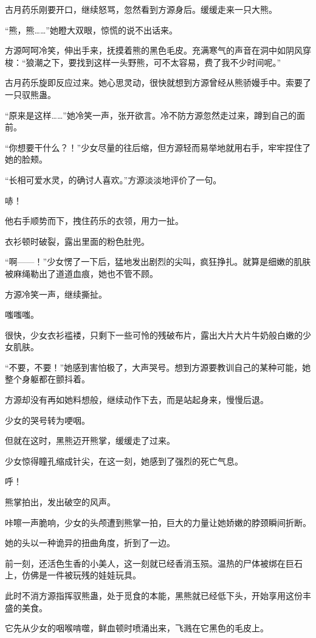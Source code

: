 \begin{this_body}
古月药乐刚要开口，继续怒骂，忽然看到方源身后。缓缓走来一只大熊。

“熊，熊……”她瞪大双眼，惊慌的说不出话来。

方源呵呵冷笑，伸出手来，抚摸着熊的黑色毛皮。充满寒气的声音在洞中如阴风穿梭：“狼潮之下，要找到这样一头野熊，可不太容易，费了我不少时间呢。”

古月药乐旋即反应过来。她心思灵动，很快就想到方源曾经从熊骄嫚手中。索要了一只驭熊蛊。

“原来是这样……”她冷笑一声，张开欲言。冷不防方源忽然走过来，蹲到自己的面前。

“你想要干什么？！”少女尽量的往后缩，但方源轻而易举地就用右手，牢牢捏住了她的脸颊。

“长相可爱水灵，的确讨人喜欢。”方源淡淡地评价了一句。

哧！

他右手顺势而下，拽住药乐的衣领，用力一扯。

衣衫顿时破裂，露出里面的粉色肚兜。

“啊——！”少女愣了一下后，猛地发出剧烈的尖叫，疯狂挣扎。就算是细嫩的肌肤被麻绳勒出了道道血痕，她也不管不顾。

方源冷笑一声，继续撕扯。

嗤嗤嗤。

很快，少女衣衫褴褛，只剩下一些可怜的残破布片，露出大片大片牛奶般白嫩的少女肌肤。

“不要，不要！”她感到害怕极了，大声哭号。想到方源要教训自己的某种可能，她整个身躯都在颤抖着。

方源却没有再如她料想般，继续动作下去，而是站起身来，慢慢后退。

少女的哭号转为哽咽。

但就在这时，黑熊迈开熊掌，缓缓走了过来。

少女惊得瞳孔缩成针尖，在这一刻，她感到了强烈的死亡气息。

呼！

熊掌拍出，发出破空的风声。

咔嚓一声脆响，少女的头颅遭到熊掌一拍，巨大的力量让她娇嫩的脖颈瞬间折断。

她的头以一种诡异的扭曲角度，折到了一边。

前一刻，还活色生香的小美人，这一刻就已经香消玉殒。温热的尸体被绑在巨石上，仿佛是一件被玩残的娃娃玩具。

此时不消方源指挥驭熊蛊，处于觅食的本能，黑熊就已经低下头，开始享用这份丰盛的美食。

它先从少女的咽喉啃噬，鲜血顿时喷涌出来，飞溅在它黑色的毛皮上。


\end{this_body}
